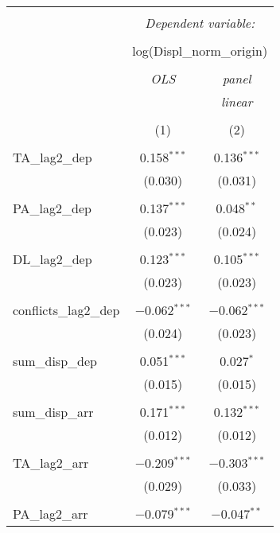 
\begin{table}[!htbp] \centering 
  \caption{} 
  \label{} 
\begin{tabular}{@{\extracolsep{5pt}}lcc} 
\\[-1.8ex]\hline 
\hline \\[-1.8ex] 
 & \multicolumn{2}{c}{\textit{Dependent variable:}} \\ 
\cline{2-3} 
\\[-1.8ex] & \multicolumn{2}{c}{log(Displ\_norm\_origin)} \\ 
\\[-1.8ex] & \textit{OLS} & \textit{panel} \\ 
 & \textit{} & \textit{linear} \\ 
\\[-1.8ex] & (1) & (2)\\ 
\hline \\[-1.8ex] 
 TA\_lag2\_dep & 0.158$^{***}$ & 0.136$^{***}$ \\ 
  & (0.030) & (0.031) \\ 
  & & \\ 
 PA\_lag2\_dep & 0.137$^{***}$ & 0.048$^{**}$ \\ 
  & (0.023) & (0.024) \\ 
  & & \\ 
 DL\_lag2\_dep & 0.123$^{***}$ & 0.105$^{***}$ \\ 
  & (0.023) & (0.023) \\ 
  & & \\ 
 conflicts\_lag2\_dep & $-$0.062$^{***}$ & $-$0.062$^{***}$ \\ 
  & (0.024) & (0.023) \\ 
  & & \\ 
 sum\_disp\_dep & 0.051$^{***}$ & 0.027$^{*}$ \\ 
  & (0.015) & (0.015) \\ 
  & & \\ 
 sum\_disp\_arr & 0.171$^{***}$ & 0.132$^{***}$ \\ 
  & (0.012) & (0.012) \\ 
  & & \\ 
 TA\_lag2\_arr & $-$0.209$^{***}$ & $-$0.303$^{***}$ \\ 
  & (0.029) & (0.033) \\ 
  & & \\ 
 PA\_lag2\_arr & $-$0.079$^{***}$ & $-$0.047$^{**}$ \\ 

\end{tabular}
\end{table}
